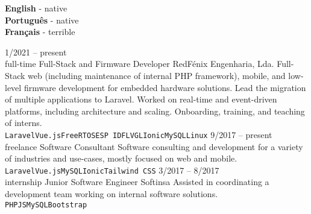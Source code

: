\documentclass[9pt]{developercv} %
\begin{document}
\hfill
\begin{minipage}[t]{0.2\textwidth}
	\vspace{-\baselineskip} %

	
	\textbf{English} - native\\
	\textbf{Português} - native\\
	\textbf{Français} - terrible
\end{minipage}



\begin{entrylist}
	\entry
		{1/2021 -- present\\\footnotesize{full-time}}
		{Full-Stack and Firmware Developer}
		{RedFénix Engenharia, Lda.}
		{Full-Stack web (including maintenance of internal PHP framework), mobile, and low-level firmware development for embedded hardware solutions. Lead the migration of multiple applications to Laravel. Worked on real-time and event-driven platforms, including architecture and scaling. Onboarding, training, and teaching of interns. \\ \texttt{Laravel}\slashsep\texttt{Vue.js}\slashsep\texttt{FreeRTOS}\slashsep\texttt{ESP IDF}\slashsep\texttt{LVGL}\slashsep\texttt{Ionic}\slashsep\texttt{MySQL}\slashsep\texttt{Linux}}
	\entry
		{9/2017 -- present\\\footnotesize{freelance}}
		{Software Consultant}
		{}
		{Software consulting and development for a variety of industries and use-cases, mostly focused on web and mobile.\\ \texttt{Laravel}\slashsep\texttt{Vue.js}\slashsep\texttt{MySQL}\slashsep\texttt{Ionic}\slashsep\texttt{Tailwind CSS}}
        \entry
		{3/2017 -- 8/2017\\\footnotesize{internship}}
		{Junior Software Engineer}
		{Softinsa}
		{Assisted in coordinating a development team working on internal software solutions.\\ \texttt{PHP}\slashsep\texttt{JS}\slashsep\texttt{MySQL}\slashsep\texttt{Bootstrap}}
\end{entrylist}

\end{document}
